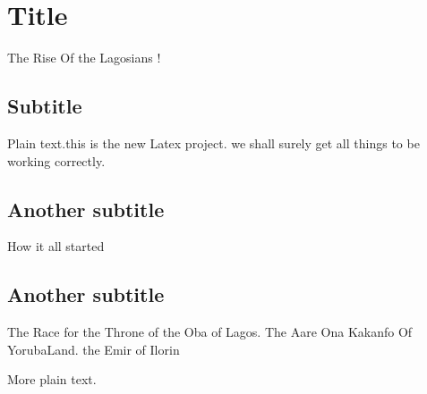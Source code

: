 \documentclass{article}
\begin{document}
\section{Title}The Rise Of the Lagosians !

\subsection{Subtitle}

Plain text.this is the new Latex project. we shall surely get all things to be
working correctly.

\subsection{Another subtitle}How it all started

\subsection{Another subtitle}The Race for the Throne of the Oba of Lagos. The
Aare Ona Kakanfo Of YorubaLand. the Emir of Ilorin

More plain text.
\end{document}

